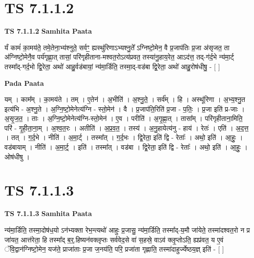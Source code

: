\documentclass[17pt]{extarticle}
\begin{document}

\section{ TS 7.1.1.2 }

\textbf{TS 7.1.1.2 } \newline
\textbf{Samhita Paata} \newline

र्यं कामं॑ का॒मय॑ते॒ तमे॒तेना॒भ्य॑श्नुते॒ सर्वꣳ॒॒ ह्यस्थु॑रिणाऽभ्यश्नु॒ते᳚ ऽग्निष्टो॒मेन॒ वै प्र॒जाप॑तिः प्र॒जा अ॑सृजत॒ ता अ॑ग्निष्टो॒मेनै॒व पर्य॑गृह्णा॒त् तासां॒ परि॑गृहीताना-मश्वत॒रोऽत्य॑प्रवत॒ तस्या॑नु॒हाय॒रेत॒ आऽद॑त्त॒ तद्-ग॑र्द॒भे न्य॑मा॒र्ट् तस्मा᳚द्-गर्द॒भो द्वि॒रेता॒ अथो॑ आहु॒र्वड॑बायां॒ न्य॑मा॒र्डिति॒ तस्मा॒द्-वड॑बा द्वि॒रेता॒ अथो॑ आहु॒रोष॑धीषु॒ - [  ] \newline

\textbf{Pada Paata} \newline

यम् । काम᳚म् । का॒मय॑ते । तम् । ए॒तेन॑ । अ॒भीति॑ । अ॒श्नु॒ते॒ । सर्व᳚म् । हि । अस्थू॑रिणा । अ॒भ्य॒श्नु॒त इत्य॑भि - अ॒श्नु॒ते । अ॒ग्नि॒ष्टो॒मेनेत्य॑ग्नि - स्तो॒मेन॑ । वै । प्र॒जाप॑ति॒रिति॑ प्र॒जा - प॒तिः॒ । प्र॒जा इति॑ प्र-जाः । अ॒सृ॒ज॒त॒ । ताः । अ॒ग्नि॒ष्टो॒मेनेत्य॑ग्नि-स्तो॒मेन॑ । ए॒व । परीति॑ । अ॒गृ॒ह्णा॒त् । तासा᳚म् । परि॑गृहीताना॒मिति॒ परि॑ - गृ॒ही॒ता॒ना॒म् । अ॒श्व॒त॒रः । अतीति॑ । अ॒प्र॒व॒त॒ । तस्य॑ । अ॒नु॒हायेत्य॑नु - हाय॑ । रेतः॑ । एति॑ । अ॒द॒त्त॒ । तत् । ग॒र्द॒भे । नीति॑ । अ॒मा॒र्ट् । तस्मा᳚त् । ग॒र्द॒भः । द्वि॒रेता॒ इति॑ द्वि - रेताः᳚ । अथो॒ इति॑ । आ॒हुः॒ । वड॑बायाम् । नीति॑ । अ॒मा॒र्ट्॒ । इति॑ । तस्मा᳚त् । वड॑बा । द्वि॒रेता॒ इति॑ द्वि - रेताः᳚ । अथो॒ इति॑ । आ॒हुः॒ । ओष॑धीषु ।  \newline





\section{ TS 7.1.1.3 }

\textbf{TS 7.1.1.3 } \newline
\textbf{Samhita Paata} \newline

न्य॑मा॒र्डिति॒ तस्मा॒दोष॑ध॒यो ऽन॑भ्यक्ता रेभ॒न्त्यथो॑ आहुः प्र॒जासु॒ न्य॑मा॒र्डिति॒ तस्मा᳚द्-य॒मौ जा॑येते॒ तस्मा॑दश्वत॒रो न प्र जा॑यत॒ आत्त॑रेता॒ हि तस्मा᳚द् ब॒र्॒.हिष्यन॑वक्लृप्तः सर्ववेद॒से वा॑ स॒हस्रे॒ वाऽव॑ क्लृ॒प्तोऽति॒ ह्यप्र॑वत॒ य ए॒वं ॅवि॒द्वान॑ग्निष्टो॒मेन॒ यज॑ते॒ प्राजा॑ताः प्र॒जा ज॒नय॑ति॒ परि॒ प्रजा॑ता गृह्णाति॒ तस्मा॑दाहुर्ज्येष्ठय॒ज्ञ् इति॑ - [  ] \newline
\end{document}
